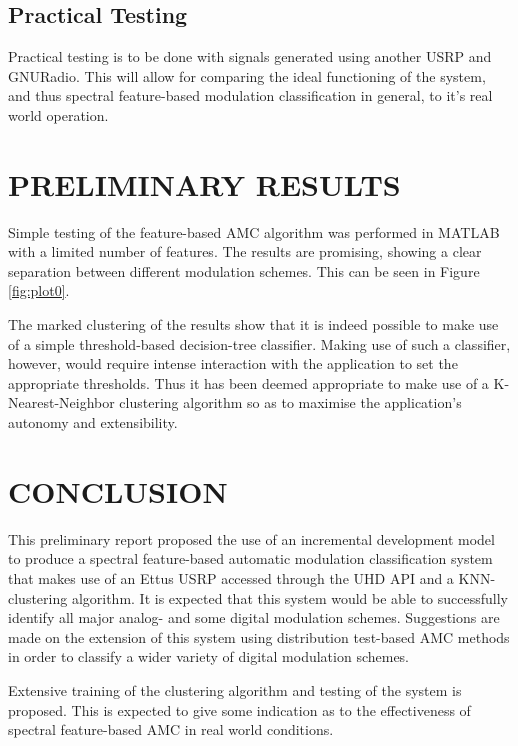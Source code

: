 \documentclass[10pt,twocolumn]{witseiepaper}
\begin{document}
	\subsection{Practical Testing}
		Practical testing is to be done with signals generated using another USRP and GNURadio. This will allow for comparing the ideal functioning of the system, and thus spectral feature-based modulation classification in general, to it's real world operation.



\section{PRELIMINARY RESULTS}
	Simple testing of the feature-based AMC algorithm was performed in MATLAB with a limited number of features. The results are promising, showing a clear separation between different modulation schemes. This can be seen in Figure \ref{fig:plot0}. 

	The marked clustering of the results show that it is indeed possible to make use of a simple threshold-based decision-tree classifier. Making use of such a classifier, however, would require intense interaction with the application to set the appropriate thresholds. Thus it has been deemed appropriate to make use of a K-Nearest-Neighbor clustering algorithm so as to maximise the application's autonomy and extensibility.

\section{CONCLUSION}
This preliminary report proposed the use of an incremental development model to produce a spectral feature-based automatic modulation classification system that makes use of an Ettus USRP accessed through the UHD API and a KNN-clustering algorithm. It is expected that this system would be able to successfully identify all major analog- and some digital modulation schemes. Suggestions are made on the extension of this system using distribution test-based AMC methods in order to classify a wider variety of digital modulation schemes.

Extensive training of the clustering algorithm and testing of the system is proposed. This is expected to give some indication as to the effectiveness of spectral feature-based AMC in real world conditions.

\newpage

 

\newpage
\onecolumn
\appendix
{}
\end{document}
